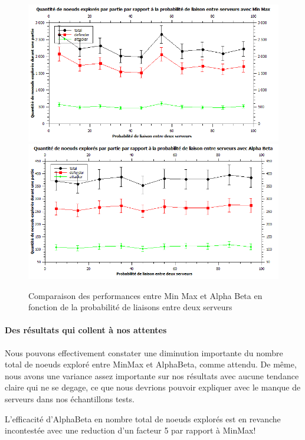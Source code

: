 \documentclass{scrreprt}
\begin{document}
    \begin{figure}
        \centering
        \includegraphics[width=\textwidth]{data/GraphLinkMM.png}
        \includegraphics[width=\textwidth]{data/GraphLinkAB.png}
        \caption{Comparaison des performances entre Min Max et Alpha Beta en
        fonction de la probabilité de liaisons entre deux serveurs}
    \end{figure}

    \paragraph{Des résultats qui collent à nos attentes}
    Nous pouvons effectivement constater une diminution importante du nombre
    total de noeuds exploré entre MinMax et AlphaBeta, comme attendu.
    De même, nous avons une variance assez importante sur nos résultats avec
    aucune tendance claire qui ne se degage, ce que nous devrions pouvoir
    expliquer avec le manque de serveurs dans nos échantillons tests.

    \begin{result}
        L'efficacité d'AlphaBeta en nombre total de noeuds explorés est en
        revanche incontestée avec une reduction d'un facteur 5 par rapport à
        MinMax!

    \end{result}
\end{document}
